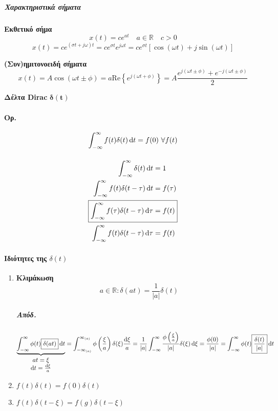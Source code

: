 \documentclass[11pt,a4paper,titlepage,fleqn]{article}
\begin{document}
	\subparagraph{Χαρακτηριστικά σήματα}
	\begin{enumpar}
		\item \textbf{Εκθετικό σήμα}
		\[
		x(t) = ce^{at}\quad a \in \mathbb R \quad c > 0
		\]
		\[
		x(t) = ce^{(\sigma t+j\omega)t} = ce^{\sigma t}e^{j\omega t}
		= ce^{\sigma t} \left[
		\cos(\omega t)+j\sin(\omega t)
		\right]
		\]
		\item \textbf{(Συν)ημιτονοειδή σήματα}
		\[
		x(t) = A \cos(\omega t\pm \phi)
		= a \mathrm{Re} \left\lbrace e^{j(\omega t +\phi)} \right\rbrace 
		= A \frac{e^{j(\omega t \pm \phi)} + e^{-j(\omega t\pm \phi)}}{2}
		\]
		\item \textbf{Δέλτα Dirac} \( \mathbf{ \delta(t)} \)
	    \paragraph{Ορ.}
	    \[
	    \int_{-\infty}^\infty f(t)\mathrm \delta(t) \dif t = f(0)\ \forall f(t)
	    \]
	    \paragraph{}
	    \begin{align*}
	    \int_{-\infty}^\infty \delta(t)\dif t &=1 \\
	    \int_{-\infty}^\infty f(t)\delta(t-\tau) \dif t &= f(\tau) \\
	    \Aboxed{\int_{-\infty}^\infty f(\tau) \delta(t-\tau)\dif \tau &= f(t)} \\
	    \int_{-\infty}^\infty f(t)\delta(t-\tau)\dif \tau &= f(t)
	    \end{align*}
	    \paragraph{Ιδιότητες της \( \delta(t) \)}
	    \begin{enumerate} %
	    	\item \textbf{Κλιμάκωση}
	    	\[
	    	a \in \mathbb R: \delta(at) = \frac{1}{|a|}\delta(t)
	    	\]
	    	\subparagraph{Απόδ.}
	    	\[
	    	\underbrace{\int_{-\infty}^\infty \phi(t)\boxed{\delta(at)}\dif t}_{\mathclap{\begin{matrix}
	    			at=\xi\\\dif t = \frac{\dif \xi}{a}
	    			\end{matrix}}}
	    =
	    	\int_{-\infty_{(a)}}^{\infty_{(a)}} \phi\left( \frac{\xi}{a} \right) \delta(\xi)\frac{\dif \xi}{a}
	    	= \frac{1}{|a|}\int_{-\infty}^\infty \frac{\phi\left(\frac{\xi}{a} \right)}{|a|}\delta(\xi)\dif\xi = \frac{\phi(0)}{|a|}
	    	= \int_{-\infty}^\infty \phi(t)\boxed{\frac{\delta(t)}{|a|}}\dif t
	    	\]
	    	\item \(
	    	f(t)\delta(t)=f(0)\delta(t)
	    	\)
	    	\item \(
	    	f(t)\delta(t-\xi)=f(g)\delta(t-\xi)
	    	\)
    	\end{enumerate}
	\end{enumpar}

	
\end{document}
